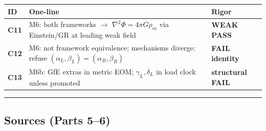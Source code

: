 \documentclass[
  11pt,
]{article}
\newcounter{none} %
\begin{document}
{\def\LTcaptype{none} %
\begin{longtable}[]{@{}
  >{\raggedright\arraybackslash}p{}
  >{\raggedright\arraybackslash}p{}
  >{\raggedright\arraybackslash}p{}@{}}
\toprule\noalign{}
\begin{minipage}[b]{\linewidth}\raggedright
ID
\end{minipage} & \begin{minipage}[b]{\linewidth}\raggedright
One-line
\end{minipage} & \begin{minipage}[b]{\linewidth}\raggedright
Rigor
\end{minipage} \\
\midrule\noalign{}
\endhead
\bottomrule\noalign{}
\endlastfoot
\textbf{C11} & M6: both frameworks $\to$ \(\nabla^2\Phi=4\pi G\rho_m\) via
Einstein/GR at leading weak field & \textbf{WEAK PASS} \\
\textbf{C12} & M6: not framework equivalence; mechanisms diverge; refuse
\((\alpha_L,\beta_L)=(\alpha_B,\beta_B)\) & \textbf{FAIL identity} \\
\textbf{C13} & M6b: GfE extras in metric EOM; \(\gamma_L,\delta_L\) in
load clock unless promoted & \textbf{structural FAIL} \\
\end{longtable}
}

\begin{center}\rule{0.5\linewidth}{0.5pt}\end{center}

\subsection{Sources (Parts 5--6)}\label{sources-parts-56}
\end{document}
